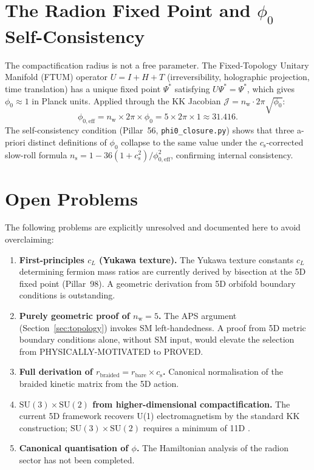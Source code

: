 \documentclass[12pt,a4paper]{article}
\newcommand{\nw}{n_{\mathrm{w}}}
\newcommand{\cs}{c_{\mathrm{s}}}
\newcommand{\phiz}{\phi_0}
\newcommand{\ns}{n_{\mathrm{s}}}
\begin{document}
\section{The Radion Fixed Point and $\phiz$ Self-Consistency}
\label{sec:ftum}

The compactification radius is not a free parameter.  The Fixed-Topology
Unitary Manifold (FTUM) operator $U=I+H+T$ (irreversibility, holographic
projection, time translation) has a unique fixed point $\Psi^*$ satisfying
$U\Psi^*=\Psi^*$, which gives $\phi_0\approx 1$ in Planck units.  Applied
through the KK Jacobian $\mathcal{J}=\nw\cdot 2\pi\sqrt{\phi_0}$:
\begin{equation}
  \phi_{0,\mathrm{eff}} = \nw\times 2\pi\times\phi_0 = 5\times 2\pi\times 1
                        \approx 31.416 .
  \label{eq:phieff}
\end{equation}
The self-consistency condition (Pillar~56, \texttt{phi0\_closure.py}) shows
that three a-priori distinct definitions of $\phi_0$ collapse to the same
value under the $\cs$-corrected slow-roll formula
$\ns=1-36(1+\cs^2)/\phi_{0,\mathrm{eff}}^2$, confirming internal consistency.

\section{Open Problems}
\label{sec:open}

The following problems are explicitly unresolved and documented here to avoid
overclaiming:

\begin{enumerate}
  \item \textbf{First-principles $c_L$ (Yukawa texture).}
        The Yukawa texture constants $c_L$ determining fermion mass ratios are
        currently derived by bisection at the 5D fixed point (Pillar~98).
        A geometric derivation from 5D orbifold boundary conditions is outstanding.
  \item \textbf{Purely geometric proof of $\nw=5$.}
        The APS argument (Section~\ref{sec:topology}) invokes SM left-handedness.
        A proof from 5D metric boundary conditions alone, without SM input, would
        elevate the selection from PHYSICALLY-MOTIVATED to PROVED.
  \item \textbf{Full derivation of $r_{\mathrm{braided}}=r_{\mathrm{bare}}\times\cs$.}
        Canonical normalisation of the braided kinetic matrix from the 5D action.
  \item \textbf{$\mathrm{SU}(3)\times\mathrm{SU}(2)$ from higher-dimensional compactification.}
        The current 5D framework recovers U(1) electromagnetism by the standard
        KK construction; $\mathrm{SU}(3)\times\mathrm{SU}(2)$ requires a
        minimum of 11D \cite{Witten1981}.
  \item \textbf{Canonical quantisation of $\phi$.}
        The Hamiltonian analysis of the radion sector has not been completed.
\end{enumerate}
\end{document}
